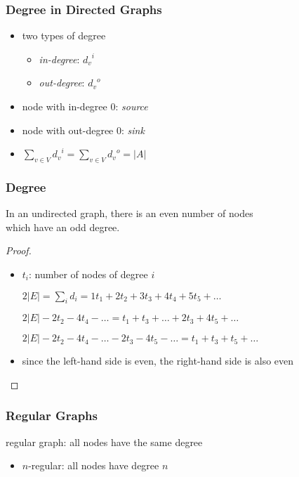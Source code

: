 \documentclass[dvipsnames]{beamer}
\begin{document}
\begin{frame}
  \frametitle{Degree in Directed Graphs}

  \begin{itemize}
    \item two types of degree
    \begin{itemize}
      \item \emph{in-degree}: ${d_v}^i$
      \item \emph{out-degree}: ${d_v}^o$
    \end{itemize}

    \pause
    \medskip
    \item node with in-degree 0: \emph{source}
    \item node with out-degree  0: \emph{sink}

    \pause
    \bigskip
    \item $\sum_{v \in V} {d_v}^i = \sum_{v \in V} {d_v}^o = |A|$
  \end{itemize}
\end{frame}

\begin{frame}
  \frametitle{Degree}

  \begin{theorem}
    In an undirected graph, there is an even number of nodes\\
    which have an odd degree.
  \end{theorem}

  \pause
  \begin{proof}
    \begin{itemize}
      \item $t_i$: number of nodes of degree $i$

      \pause
$2|E| = \sum_i d_i = 1t_1 + 2t_2 + 3t_3 + 4t_4 + 5t_5 + \dots$

\pause
$2|E| - 2t_2 - 4t_4 - \dots = t_1 + t_3 + \dots + 2t_3 + 4t_5 + \dots$

\pause
$2|E| - 2t_2 - 4t_4 - \dots - 2t_3 - 4t_5 - \dots = t_1 + t_3 + t_5 + \dots$

      \pause
      \item since the left-hand side is even, the right-hand side is also even
    \end{itemize}
  \end{proof}
\end{frame}

\begin{frame}
  \frametitle{Regular Graphs}

  \begin{definition}
    \alert{regular} graph: all nodes have the same degree

    \begin{itemize}
      \item $n$-regular: all nodes have degree $n$
    \end{itemize}
  \end{definition}
\end{frame}
\end{document}
